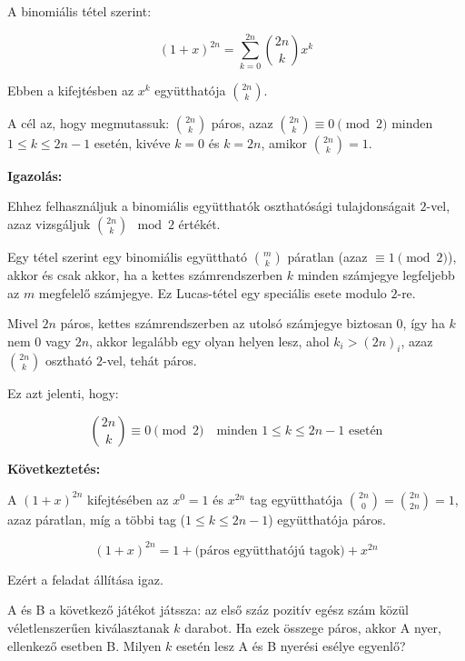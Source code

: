 \begin{solution}
A binomiális tétel szerint:

\[
(1+x)^{2n}=\sum_{k=0}^{2n}\binom{2n}{k}x^{k}
\]

Ebben a kifejtésben az $x^{k}$ együtthatója $\binom{2n}{k}$.

A cél az, hogy megmutassuk: $\binom{2n}{k}$ páros, azaz $\binom{2n}{k}\equiv0\pmod 2$
minden $1\leq k\leq2n-1$ esetén, kivéve $k=0$ és $k=2n$, amikor
$\binom{2n}{k}=1$.

\textbf{Igazolás:}

Ehhez felhasználjuk a binomiális együtthatók oszthatósági tulajdonságait
$2$-vel, azaz vizsgáljuk $\binom{2n}{k}\mod 2$ értékét.

Egy tétel szerint egy binomiális együttható $\binom{m}{k}$ páratlan
(azaz $\equiv1\pmod 2$), akkor és csak akkor, ha a kettes számrendszerben
$k$ minden számjegye legfeljebb az $m$ megfelelő számjegye. Ez Lucas-tétel
egy speciális esete modulo $2$-re.

Mivel $2n$ páros, kettes számrendszerben az utolsó számjegye biztosan
$0$, így ha $k$ nem $0$ vagy $2n$, akkor legalább egy olyan helyen
lesz, ahol $k_{i}>(2n)_{i}$, azaz $\binom{2n}{k}$ osztható $2$-vel,
tehát páros.

Ez azt jelenti, hogy:

\[
\binom{2n}{k}\equiv0\pmod 2\quad\text{minden }1\leq k\leq2n-1\text{ esetén}
\]

\textbf{Következtetés:}

A $(1+x)^{2n}$ kifejtésében az $x^{0}=1$ és $x^{2n}$ tag együtthatója
$\binom{2n}{0}=\binom{2n}{2n}=1$, azaz páratlan, míg a többi tag
($1\leq k\leq2n-1$) együtthatója páros.

\[
(1+x)^{2n}=1+\text{(páros együtthatójú tagok)}+x^{2n}
\]

Ezért a feladat állítása igaz.
\end{solution}
\begin{extraproblem}
 A és B a következő játékot játssza: az első száz pozitív egész szám
közül véletlenszerűen kiválasztanak $k$ darabot. Ha ezek összege
páros, akkor A nyer, ellenkező esetben B. Milyen $k$ esetén lesz
A és B nyerési esélye egyenlő?
\end{extraproblem}

